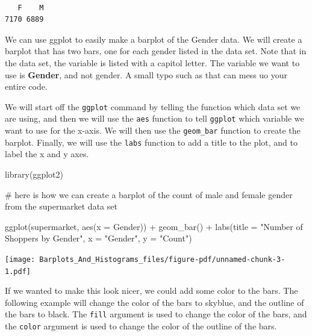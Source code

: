 \documentclass[
  letterpaper,
  DIV=11,
  numbers=noendperiod]{scrreprt}
\newenvironment{Shaded}{\begin{snugshade}}{\end{snugshade}}
\newcommand{\AttributeTok}[1]{\textcolor[rgb]{0.40,0.45,0.13}{#1}}
\newcommand{\CommentTok}[1]{\textcolor[rgb]{0.37,0.37,0.37}{#1}}
\newcommand{\FunctionTok}[1]{\textcolor[rgb]{0.28,0.35,0.67}{#1}}
\newcommand{\NormalTok}[1]{\textcolor[rgb]{0.00,0.23,0.31}{#1}}
\newcommand{\OtherTok}[1]{\textcolor[rgb]{0.00,0.23,0.31}{#1}}
\newcommand{\SpecialCharTok}[1]{\textcolor[rgb]{0.37,0.37,0.37}{#1}}
\newcommand{\StringTok}[1]{\textcolor[rgb]{0.13,0.47,0.30}{#1}}
\begin{document}
\begin{Shaded}
\end{Shaded}

\begin{verbatim}

   F    M 
7170 6889 
\end{verbatim}

We can use ggplot to easily make a barplot of the Gender data. We will
create a barplot that has two bars, one for each gender listed in the
data set. Note that in the data set, the variable is listed with a
capitol letter. The variable we want to use is \textbf{Gender}, and not
gender. A small typo such as that can mess uo your entire code.

We will start off the \texttt{ggplot} command by telling the function
which data set we are using, and then we will use the \texttt{aes}
function to tell \texttt{ggplot} which variable we want to use for the
x-axis. We will then use the \texttt{geom\_bar} function to create the
barplot. Finally, we will use the \texttt{labs} function to add a title
to the plot, and to label the x and y axes.

\begin{Shaded}
\begin{Highlighting}[]
\FunctionTok{library}\NormalTok{(ggplot2)}

\CommentTok{\# here is how we can create a barplot of the count of  male and female gender from the supermarket data set}

\FunctionTok{ggplot}\NormalTok{(supermarket, }\FunctionTok{aes}\NormalTok{(}\AttributeTok{x =}\NormalTok{ Gender)) }\SpecialCharTok{+}
  \FunctionTok{geom\_bar}\NormalTok{() }\SpecialCharTok{+}
  \FunctionTok{labs}\NormalTok{(}\AttributeTok{title =} \StringTok{"Number of Shoppers by Gender"}\NormalTok{,}
       \AttributeTok{x =} \StringTok{"Gender"}\NormalTok{,}
       \AttributeTok{y =} \StringTok{"Count"}\NormalTok{)}
\end{Highlighting}
\end{Shaded}

\texttt{[image: Barplots\_And\_Histograms\_files/figure-pdf/unnamed-chunk-3-1.pdf]}

If we wanted to make this look nicer, we could add some color to the
bars. The following example will change the color of the bars to
skyblue, and the outline of the bars to black. The \texttt{fill}
argument is used to change the color of the bars, and the \texttt{color}
argument is used to change the color of the outline of the bars.
\end{document}
